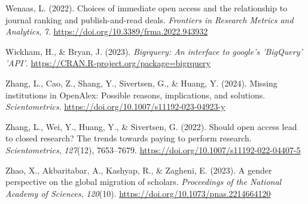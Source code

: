 \documentclass[a4paper,man,floatsintext,longtable,noextraspace,12pt]{apa6}
\newenvironment{CSLReferences}%
  {}%
  {\par}
\begin{document}
\begin{CSLReferences}{1}{0}
\leavevmode{}%
Wenaas, L. (2022). Choices of immediate open access and the relationship
to journal ranking and publish-and-read deals. \emph{Frontiers in
Research Metrics and Analytics}, \emph{7}.
\url{https://doi.org/10.3389/frma.2022.943932}

\leavevmode{}%
Wickham, H., \& Bryan, J. (2023). \emph{Bigrquery: An interface to
google's 'BigQuery' 'API'}.
\url{https://CRAN.R-project.org/package=bigrquery}

\leavevmode{}%
Zhang, L., Cao, Z., Shang, Y., Sivertsen, G., \& Huang, Y. (2024).
Missing institutions in OpenAlex: Possible reasons, implications, and
solutions. \emph{Scientometrics}.
\url{https://doi.org/10.1007/s11192-023-04923-y}

\leavevmode{}%
Zhang, L., Wei, Y., Huang, Y., \& Sivertsen, G. (2022). Should open
access lead to closed research? The trends towards paying to perform
research. \emph{Scientometrics}, \emph{127}(12), 7653--7679.
\url{https://doi.org/10.1007/s11192-022-04407-5}

\leavevmode{}%
Zhao, X., Akbaritabar, A., Kashyap, R., \& Zagheni, E. (2023). A gender
perspective on the global migration of scholars. \emph{Proceedings of
the National Academy of Sciences}, \emph{120}(10).
\url{https://doi.org/10.1073/pnas.2214664120}

\end{CSLReferences}
\end{document}
